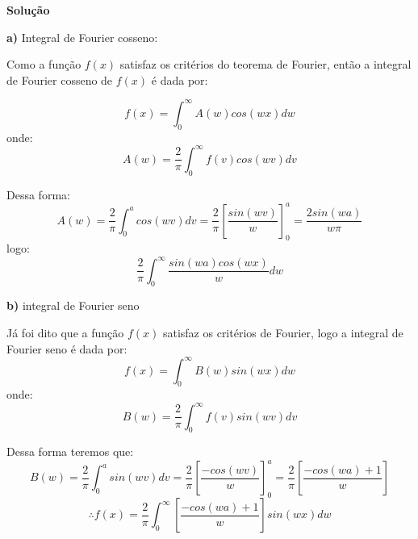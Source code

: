 \linespread{1.5}

\textbf{Solução}

\textbf{a)} Integral de Fourier cosseno:

Como a função $f(x)$ satisfaz os critérios do teorema de Fourier, então a integral de Fourier cosseno de $f(x)$ é dada por:

\begin{equation*}
    f(x) =  \int_0^\infty A(w) cos(wx)dw
\end{equation*}
onde:
\begin{equation*}
    A(w) = \frac{2}{\pi}\int_0^\infty f(v) cos(wv)dv
\end{equation*}

Dessa forma:
\begin{equation*}
    A(w) = \frac{2}{\pi} \int_0^a cos(wv)dv = \frac{2}{\pi}\left[\frac{sin(wv)}{w}\right]^a_0 = \frac{2sin(wa)}{w\pi}
\end{equation*}
logo:
\begin{equation*}
    \boxed{ \frac{2}{\pi}\int_0^\infty \frac{sin(wa)cos(wx)}{w}dw }
\end{equation*}

\textbf{b)} integral de Fourier seno

Já foi dito que a função $f(x)$ satisfaz os critérios de Fourier, logo a integral de Fourier seno é dada por:
\begin{equation*}
    f(x) = \int_0^\infty B(w)sin(wx)dw
\end{equation*}
onde:
\begin{equation*}
    B(w) = \frac{2}{\pi} \int_0^\infty f(v) sin(wv)dv
\end{equation*}

Dessa forma teremos que:
\begin{equation*}
    B(w) = \frac{2}{\pi} \int_0^a sin(wv)dv = \frac{2}{\pi}\left[\frac{-cos(wv)}{w}\right]^a_0 = \frac{2}{\pi}\left[\frac{-cos(wa)+1}{w}\right]
\end{equation*}
\begin{equation*}
    \therefore \boxed{ f(x) = \frac{2}{\pi}\int_0^\infty \left[\frac{-cos(wa)+1}{w}\right] sin(wx)dw }
\end{equation*}